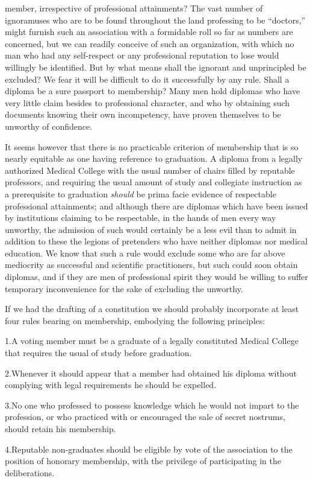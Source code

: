 member, irrespective of professional attainments? The vast number
of ignoramuses who are to be found throughout the land professing to
be ``doctors,'' might furnish such an association with a formidable roll
so far as numbers are concerned, but we can readily conceive of such
an organization, with which no man who had any self-respect or any professional
reputation to lose would willingly be identified. But by what
means shall the ignorant and unprincipled be excluded? We fear it
will be difficult to do it successfully by any rule. Shall a diploma be
a sure passport to membership? Many men hold diplomas who have
very little claim besides to professional character, and who by obtaining
such documents knowing their own incompetency, have proven themselves
to be unworthy of confidence.

It seems however that there is no practicable criterion of membership
that is so nearly equitable as one having reference to graduation.
A diploma from a legally authorized Medical College with the usual
number of chairs filled by reputable professors, and requiring the usual
amount of study and collegiate instruction as a prerequisite to graduation
\emph{should} be prima facie evidence of respectable professional attainments;
and although there are diplomas which have been issued by
institutions claiming to be respectable, in the hands of men every way
unworthy, the admission of such would certainly be a less evil than to
admit in addition to these the legions of pretenders who have neither
diplomas nor medical education. We know that such a rule would exclude
some who are far above mediocrity as successful and scientific
practitioners, but such could soon obtain diplomas, and if they are men
of professional spirit they would be willing to suffer temporary inconvenience
for the sake of excluding the unworthy.

If we had the drafting of a constitution we should probably incorporate
at least four rules bearing on membership, embodying the following
principles:

1.\quad{}A voting member must be a graduate of a legally constituted
Medical College that requires the usual  of study before graduation.

2.\quad{}Whenever it should appear that a member had obtained his
diploma without complying with legal requirements he should be expelled.

3.\quad{}No one who professed to possess knowledge which he would not
impart to the profession, or who practiced with or encouraged the sale of
secret nostrums, should retain his membership.

4.\quad{}Reputable non-graduates should be eligible by vote of the association
to the position of honorary membership, with the privilege of
participating in the deliberations.\endinput
